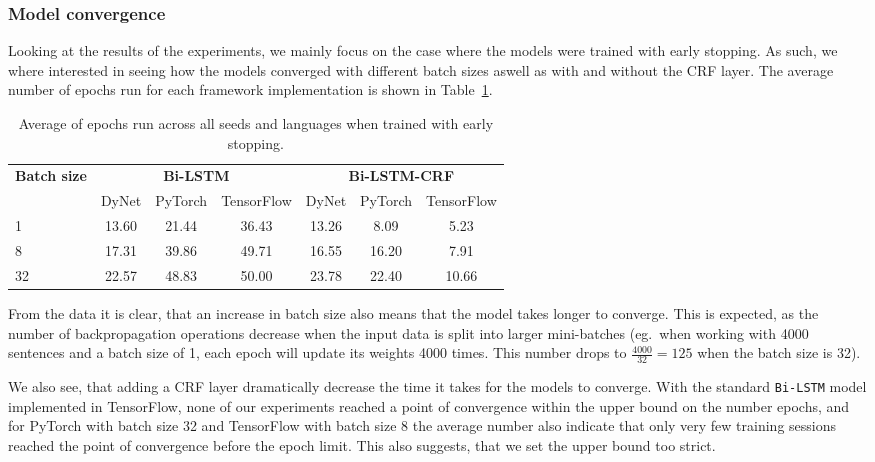 \subsubsection{Model convergence}

Looking at the results of the experiments, we mainly focus on the case where the
models were trained with early stopping. As such, we where
interested in seeing how the models converged with different batch sizes aswell
as with and without the CRF layer. The average number of epochs run for each
framework implementation is shown in Table~\ref{table:epochs-run-pos}.

\begin{table}[h!]
    \centering
    \begin{tabular}{l c c c|c c c}
        \toprule
        \multirow{2}{*}{\bfseries Batch size}     &
        \multicolumn{3}{c}{\bfseries Bi-LSTM}     &
        \multicolumn{3}{c}{\bfseries Bi-LSTM-CRF} \\
        \cmidrule(lr){2-7}
        & DyNet & PyTorch & TensorFlow
        & DyNet & PyTorch & TensorFlow \\
        \cmidrule(lr){1-7}
         1 & 13.60 & 21.44 & 36.43 & 13.26 &  8.09 &  5.23 \\
         8 & 17.31 & 39.86 & 49.71 & 16.55 & 16.20 &  7.91 \\
        32 & 22.57 & 48.83 & 50.00 & 23.78 & 22.40 & 10.66 \\
        \bottomrule
    \end{tabular}
    \caption{Average of epochs run across all seeds and languages when trained
        with early stopping.
    }\label{table:epochs-run-pos}
\end{table}

From the data it is clear, that an increase in batch size also means that the
model takes longer to converge. This is expected, as the number of
backpropagation operations decrease when the input data is split into larger
mini-batches (eg.\ when working with 4000 sentences and a batch size of 1, each
epoch will update its weights 4000 times. This number drops to
$\frac{4000}{32}=125$ when the batch size is 32).

We also see, that adding a CRF layer dramatically decrease the time it takes for
the models to converge. With the standard \texttt{Bi-LSTM} model implemented in
TensorFlow, none of our experiments reached a point of convergence within the
upper bound on the number epochs, and for PyTorch with batch size 32 and
TensorFlow with batch size 8 the average number also indicate that only very few
training sessions reached the point of convergence before the epoch limit. This
also suggests, that we set the upper bound too strict.

